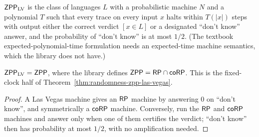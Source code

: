 \begin{definition}
  \label{def:encodings-zpp-lv}
  $\mathsf{ZPP}_{\mathrm{LV}}$ is the class of languages $L$ with a probabilistic
  machine $N$ and a polynomial $T$ such that every trace on every input $x$
  halts within $T(|x|)$ steps with output either the correct verdict
  $[x \in L]$ or a designated ``don't know'' answer, and the probability of
  ``don't know'' is at most $1/2$. (The textbook expected-polynomial-time
  formulation needs an expected-time machine semantics, which the library does
  not have.)
\end{definition}

\begin{theorem}
  \label{thm:encodings-zpp-lv}
  \notready
  $\mathsf{ZPP}_{\mathrm{LV}} = \mathsf{ZPP}$, where the library defines
  $\mathsf{ZPP} = \mathsf{RP} \cap \mathsf{coRP}$. This is the fixed-clock half of
  Theorem~\ref{thm:randomness-zpp-las-vegas}.
\end{theorem}
\begin{proof}
  A Las Vegas machine gives an $\mathsf{RP}$ machine by answering $0$ on ``don't
  know'', and symmetrically a $\mathsf{coRP}$ machine. Conversely, run the
  $\mathsf{RP}$ and $\mathsf{coRP}$ machines and answer only when one of them
  certifies the verdict; ``don't know'' then has probability at most $1/2$,
  with no amplification needed.
\end{proof}
